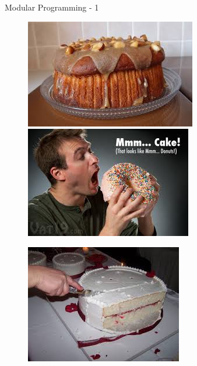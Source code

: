 \documentclass[14pt]{beamer}
\begin{document}
\begin{frame}{Modular Programming - 1}
 \begin{figure}[H]
  \begin{minipage}{5cm}
   \includegraphics[scale=.4]{modular-programming-cake1.png}
  \end{minipage}
  \quad
  \begin{minipage}{5cm}
   \includegraphics[scale=.4]{modular-programming-cake2.png}
  \end{minipage}
 \end{figure}

 \begin{figure}[H]
  \begin{center}
   \includegraphics[scale=.4]{modular-programming-cake3.png}
  \end{center}

 \end{figure}

\end{frame}
\end{document}
